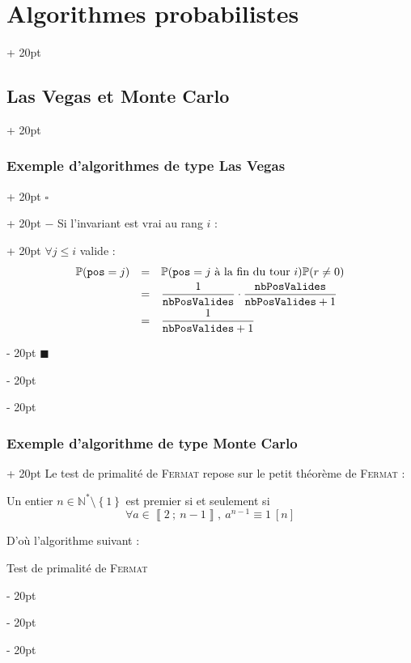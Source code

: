 \documentclass[a4paper, 12pt, twoside]{article}
\newenvironment{indalgo}[2][H]{
    \begin{algoBox}
        \begin{algorithm}[#1]
            \caption{#2}
}
{
        \end{algorithm}
    \end{algoBox}
}
\newcommand{\N}{\mathbb{N}} %
\newcommand{\nset}[2]{\left\llbracket #1\ ;\ #2 \right\rrbracket}
\newcommand{\set}[1]{\left\{ #1 \right\}}
\renewcommand{\le}{\leqslant}
\newcommand{\ind}[1][20pt]{\advance\leftskip + #1}
\newcommand{\deind}[1][20pt]{\advance\leftskip - #1}
\newenvironment{indt}[2][20pt]{#2 \par \ind[#1]}{\par \deind} %
\newenvironment{proof}[1][{}]{\begin{indt}{$\square$ #1}}{$\blacksquare$ \end{indt}}
\newcommand{\1}{\mathbbm 1}
\begin{document}
\begin{indt}{\section{Algorithmes probabilistes}}
\begin{indt}{\subsection{Las Vegas et Monte Carlo}}
\begin{indt}{\subsubsection{Exemple d'algorithmes de type Las Vegas}}
\begin{proof}
\begin{indt}{$-$ Si l'invariant est vrai au rang $i$ :}
                        $\forall j \le i$ valide :
                        \[
                            \begin{array}{rcl}
                                \mathbb P(\mathtt{pos} = j)
                                &=& \mathbb P(\mathtt{pos} = j\ \text{à la fin du tour}\ i) \mathbb{P}(r \neq 0)
                                \vspace{3pt}
                                \\
                                &=& \dfrac 1 {\mathtt{nbPosValides}} \cdot \dfrac{\mathtt{nbPosValides}}{\mathtt{nbPosValides} + 1}
                                \vspace{3pt}
                                \\
                                &=& \dfrac{1}{\mathtt{nbPosValides} + 1}
                            \end{array}
                        \]
                    \end{indt}
                \end{proof}
            \end{indt}

            \vspace{12pt}
            
            \begin{indt}{\subsubsection{Exemple d'algorithme de type Monte Carlo}}
                Le test de primalité de \textsc{Fermat} repose sur le petit théorème de \textsc{Fermat} :
                \begin{emphBox}
                    Un entier $n \in \N^* \setminus \set 1$ est premier si et seulement si
                    \[
                        \forall a \in \nset 2 {n - 1},\ a^{n - 1} \equiv 1\ [n]
                    \]
                \end{emphBox}

                D'où l'algorithme suivant :
                \begin{indalgo}{Test de primalité de \textsc{Fermat}}

                \end{indalgo}


\end{indt}
\end{indt}
\end{indt}
\end{document}
